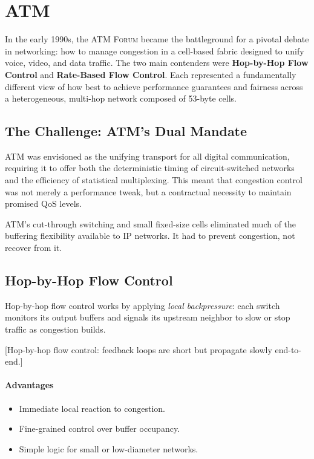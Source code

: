\documentclass[../../../OAE-SPEC-MAIN.tex]{subfiles}
\begin{document}
\section{ATM}

In the early 1990s, the \textsc{ATM Forum} became the battleground for a pivotal debate in networking: how to manage congestion in a cell-based fabric designed to unify voice, video, and data traffic. The two main contenders were \textbf{Hop-by-Hop Flow Control} and \textbf{Rate-Based Flow Control}. Each represented a fundamentally different view of how best to achieve performance guarantees and fairness across a heterogeneous, multi-hop network composed of 53-byte cells.


\subsection{The Challenge: ATM’s Dual Mandate}

ATM was envisioned as the unifying transport for all digital communication, requiring it to offer both the deterministic timing of circuit-switched networks and the efficiency of statistical multiplexing. This meant that congestion control was not merely a performance tweak, but a contractual necessity to maintain promised QoS levels.

ATM’s cut-through switching and small fixed-size cells eliminated much of the buffering flexibility available to IP networks. It had to prevent congestion, not recover from it.


\subsection{Hop-by-Hop Flow Control}

Hop-by-hop flow control works by applying \textit{local backpressure}: each switch monitors its output buffers and signals its upstream neighbor to slow or stop traffic as congestion builds.

[Hop-by-hop flow control: feedback loops are short but propagate slowly end-to-end.]

\paragraph{Advantages}
\begin{itemize}
  \item Immediate local reaction to congestion.
  \item Fine-grained control over buffer occupancy.
  \item Simple logic for small or low-diameter networks.
\end{itemize}
\end{document}
